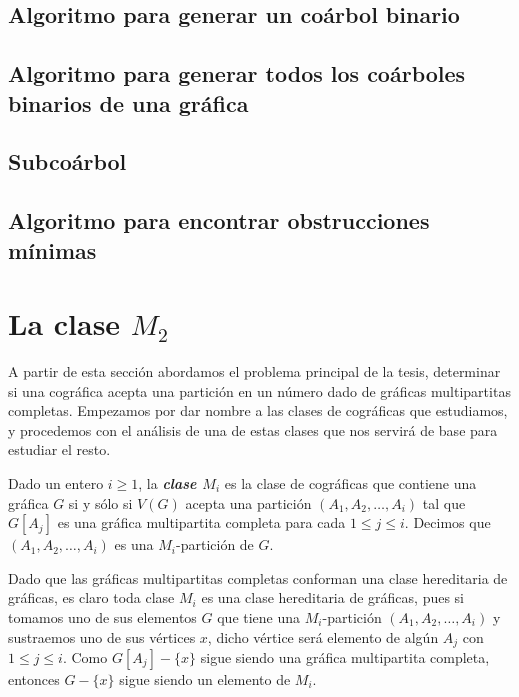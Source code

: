     \subsection{Algoritmo para generar un coárbol binario}
        
    \subsection{Algoritmo para generar todos los coárboles binarios de una gráfica}
        
    \subsection{Subcoárbol}
        
    \subsection{Algoritmo para encontrar obstrucciones mínimas} \label{sec_AlgoSub}
        


\section{La clase $M_2$}

    A partir de esta sección abordamos el problema principal de la tesis, determinar si una cográfica acepta una partición en un número dado de gráficas multipartitas completas. Empezamos por dar nombre a las clases de cográficas que estudiamos, y procedemos con el análisis de una de estas clases que nos servirá de base para estudiar el resto. 
    
    \begin{definition}
        Dado un entero $i\geq 1$, la \textbf{\emph{clase $M_i$}} es la clase de cográficas que contiene una gráfica $G$ si y sólo si $V(G)$ acepta una partición $(A_1, A_2, \dots, A_i)$ tal que $G[A_j]$ es una gráfica multipartita completa para cada $1\leq j \leq i$.  Decimos que $(A_1, A_2, \dots, A_i)$ es una $M_i$-partición de $G$.
    \end{definition}

    Dado que las gráficas multipartitas completas conforman una clase hereditaria de gráficas, es claro toda clase $M_i$ es una clase hereditaria de gráficas, pues si tomamos uno de sus elementos $G$ que tiene una $M_i$-partición $(A_1, A_2, \dots, A_i)$ y sustraemos uno de sus vértices $x$, dicho vértice será elemento de algún $A_j$ con $1\leq j \leq i$. Como $G[A_j]-\{x\}$ sigue siendo una gráfica multipartita completa, entonces $G-\{x\}$ sigue siendo un elemento de $M_i$. 
    
